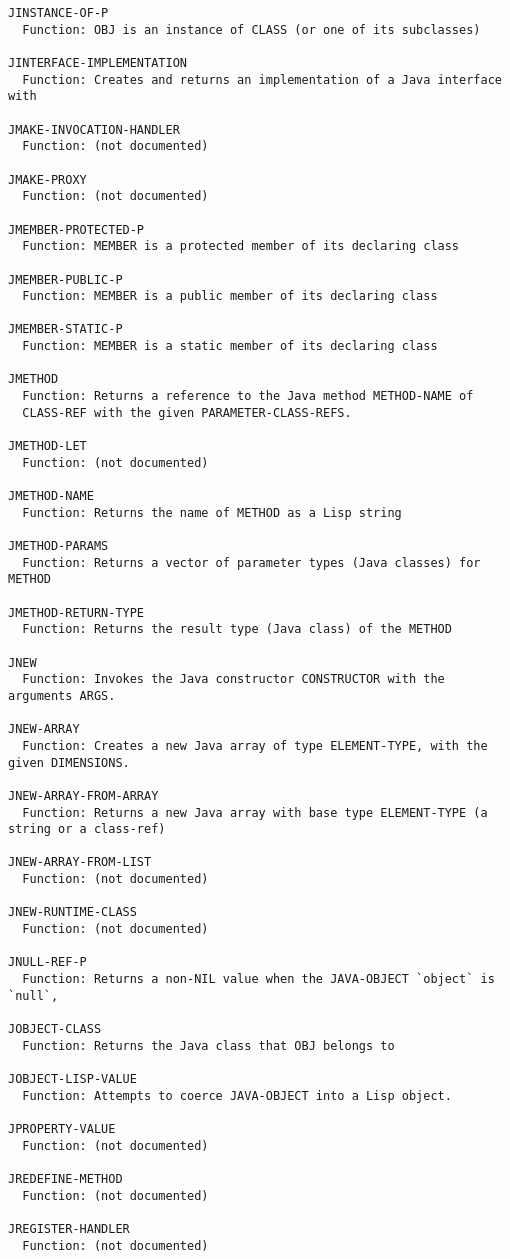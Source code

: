 \begin{verbatim}
JINSTANCE-OF-P
  Function: OBJ is an instance of CLASS (or one of its subclasses)

JINTERFACE-IMPLEMENTATION
  Function: Creates and returns an implementation of a Java interface with

JMAKE-INVOCATION-HANDLER
  Function: (not documented)

JMAKE-PROXY
  Function: (not documented)

JMEMBER-PROTECTED-P
  Function: MEMBER is a protected member of its declaring class

JMEMBER-PUBLIC-P
  Function: MEMBER is a public member of its declaring class

JMEMBER-STATIC-P
  Function: MEMBER is a static member of its declaring class

JMETHOD
  Function: Returns a reference to the Java method METHOD-NAME of
  CLASS-REF with the given PARAMETER-CLASS-REFS.

JMETHOD-LET
  Function: (not documented)

JMETHOD-NAME
  Function: Returns the name of METHOD as a Lisp string

JMETHOD-PARAMS
  Function: Returns a vector of parameter types (Java classes) for METHOD

JMETHOD-RETURN-TYPE
  Function: Returns the result type (Java class) of the METHOD

JNEW
  Function: Invokes the Java constructor CONSTRUCTOR with the arguments ARGS.

JNEW-ARRAY
  Function: Creates a new Java array of type ELEMENT-TYPE, with the given DIMENSIONS.

JNEW-ARRAY-FROM-ARRAY
  Function: Returns a new Java array with base type ELEMENT-TYPE (a string or a class-ref)

JNEW-ARRAY-FROM-LIST
  Function: (not documented)

JNEW-RUNTIME-CLASS
  Function: (not documented)

JNULL-REF-P
  Function: Returns a non-NIL value when the JAVA-OBJECT `object` is `null`,

JOBJECT-CLASS
  Function: Returns the Java class that OBJ belongs to

JOBJECT-LISP-VALUE
  Function: Attempts to coerce JAVA-OBJECT into a Lisp object.

JPROPERTY-VALUE
  Function: (not documented)

JREDEFINE-METHOD
  Function: (not documented)

JREGISTER-HANDLER
  Function: (not documented)


\end{verbatim}
